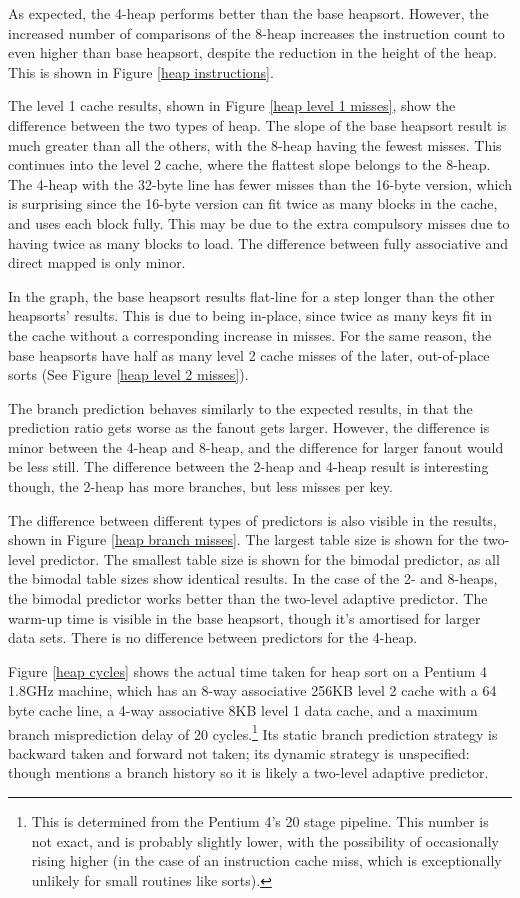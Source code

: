 As expected, the 4-heap performs better than the base heapsort. However, the
increased number of comparisons of the 8-heap increases the instruction count to
even higher than base heapsort, despite the reduction in the height of the heap.
This is shown in Figure \ref{heap instructions}.

The level 1 cache results, shown in Figure \ref{heap level 1 misses}, show the
difference between the two types of heap. The slope of the base heapsort result
is much greater than all the others, with the 8-heap having the fewest misses.
This continues into the level 2 cache, where the flattest slope belongs to the
8-heap. The 4-heap with the 32-byte line has fewer misses than the 16-byte
version, which is surprising since the 16-byte version can fit twice as many
blocks in the cache, and uses each block fully.  This may be due to the extra
compulsory misses due to having twice as many blocks to load. The difference
between fully associative and direct mapped is only minor.

In the graph, the base heapsort results flat-line for a step longer than the
other heapsorts' results. This is due to being in-place, since twice as many
keys fit in the cache without a corresponding increase in misses. For the same
reason, the base heapsorts have half as many level 2 cache misses of the later,
out-of-place sorts (See Figure \ref{heap level 2 misses}).

The branch prediction behaves similarly to the expected results, in that the
prediction ratio gets worse as the fanout gets larger. However, the difference
is minor between the 4-heap and 8-heap, and the difference for larger fanout
would be less still. The difference between the 2-heap and 4-heap result is
interesting though, the 2-heap has more branches, but less misses per key.

The difference between different types of predictors is also visible in the
results, shown in Figure \ref{heap branch misses}. The largest table size is
shown for the two-level predictor. The smallest table size is shown for the
bimodal predictor, as all the bimodal table sizes show identical results.  In
the case of the 2- and 8-heaps, the bimodal predictor works better than the
two-level adaptive predictor. The warm-up time is visible in the base heapsort,
though it's amortised for larger data sets. There is no difference between
predictors for the 4-heap.

Figure \ref{heap cycles} shows the actual time taken for heap sort on a Pentium
4 1.8GHz machine, which has an 8-way associative 256KB level 2 cache with a 64 byte
cache line, a 4-way associative 8KB level 1 data cache, and a maximum branch
misprediction delay of 20 cycles.\footnote{This is determined from the Pentium
4's 20 stage pipeline. This number is not exact, and is probably slightly lower,
with the possibility of occasionally rising higher (in the case of an
instruction cache miss, which is exceptionally unlikely for small routines like
sorts).} Its static branch prediction strategy is backward taken and forward
not taken; its dynamic strategy is unspecified: though \cite{Intel248966-010}
mentions a branch history so it is likely a two-level adaptive predictor.

